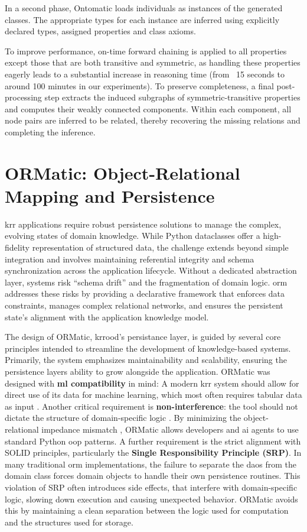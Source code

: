 \documentclass[a4paper,fleqn]{cas-sc}
\begin{document}
In a second phase, Ontomatic loads individuals as instances of the generated classes. The appropriate types for each instance are inferred using explicitly declared types, assigned properties and class axioms.

To improve performance, on-time forward chaining is applied to all properties except those that are both transitive and symmetric, as handling these properties eagerly leads to a substantial increase in reasoning time (from ~15 seconds to around 100 minutes in our experiments). To preserve completeness, a final post-processing step extracts the induced subgraphs of symmetric-transitive properties and computes their weakly connected components. Within each component, all node pairs are inferred to be related, thereby recovering the missing relations and completing the inference.

\section{ORMatic: Object-Relational Mapping and Persistence}
\label{sec:ormatic}

\Ac{krr} applications require robust persistence solutions to manage the complex, evolving states of domain knowledge. While Python dataclasses offer a high-fidelity representation of structured data, the challenge extends beyond simple integration and involves maintaining referential integrity and schema synchronization across the application lifecycle. Without a dedicated abstraction layer, systems risk ``schema drift'' and the fragmentation of domain logic. \Ac{orm} addresses these risks by providing a declarative framework that enforces data constraints, manages complex relational networks, and ensures the persistent state's alignment with the application knowledge model.

The design of ORMatic, \ac{krrood}'s persistance layer, is guided by several core principles intended to streamline the development of knowledge-based systems. Primarily, the system emphasizes maintainability and scalability, ensuring the persistence layers ability to grow alongside the application. ORMatic was designed with \textbf{
\ac{ml} compatibility} in mind: A modern \ac{krr} system should allow for direct use of its data for machine learning, which most often requires tabular data as input \citep{kleppmann2019designing}.
Another critical requirement is \textbf{non-interference}: the tool should not dictate the structure of domain-specific logic \citep{davis1993knowledge}. By minimizing the object-relational impedance mismatch \citep{neward2006vietnam}, ORMatic allows developers and \ac{ai} agents to use standard Python \ac{oop} patterns.
A further requirement is the strict alignment with SOLID principles, particularly the \textbf{Single Responsibility Principle (SRP)}. In many traditional \ac{orm} implementations, the failure to separate the \acp{dao} from the domain class forces domain objects to handle their own persistence routines. This violation of SRP often introduces side effects, that interfere with domain-specific logic, slowing down execution and causing unexpected behavior. ORMatic avoids this by maintaining a clean separation between the logic used for computation and the structures used for storage.
\end{document}
